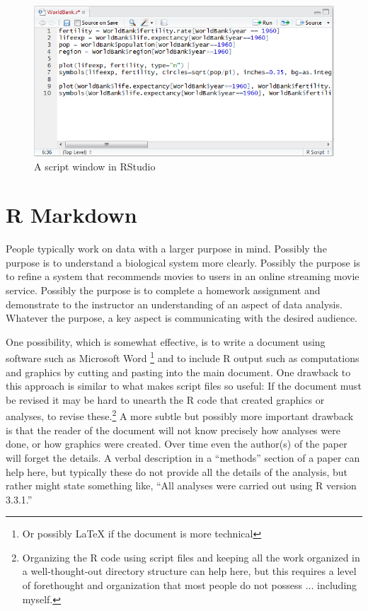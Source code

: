 \documentclass[]{krantz}
\begin{document}
\begin{figure}
\includegraphics[width=1\linewidth]{../figures/ScriptWindow} \caption{A script window in RStudio}\label{fig:script}
\end{figure}

\hypertarget{r-markdown}{%
\section{R Markdown}\label{r-markdown}}

People typically work on data with a larger purpose in mind. Possibly the purpose is to understand a biological system more clearly. Possibly the purpose is to refine a system that recommends movies to users in an online streaming movie service. Possibly the purpose is to complete a homework assignment and demonstrate to the instructor an understanding of an aspect of data analysis. Whatever the purpose, a key aspect is communicating with the desired audience.

One possibility, which is somewhat effective, is to write a document using software such as Microsoft Word \footnote{Or possibly LaTeX if the document is more technical} and to include R output such as computations and graphics by cutting and pasting into the main document. One drawback to this approach is similar to what makes script files so useful: If the document must be revised it may be hard to unearth the R code that created graphics or analyses, to revise these.\footnote{Organizing the R code using script files and keeping all the work organized in a well-thought-out directory structure can help here, but this requires a level of forethought and organization that most people do not possess \(\ldots\) including myself.} A more subtle but possibly more important drawback is that the reader of the document will not know precisely how analyses were done, or how graphics were created. Over time even the author(s) of the paper will forget the details. A verbal description in a ``methods'' section of a paper can help here, but typically these do not provide all the details of the analysis, but rather might state something like, ``All analyses were carried out using R version 3.3.1.''
\end{document}
